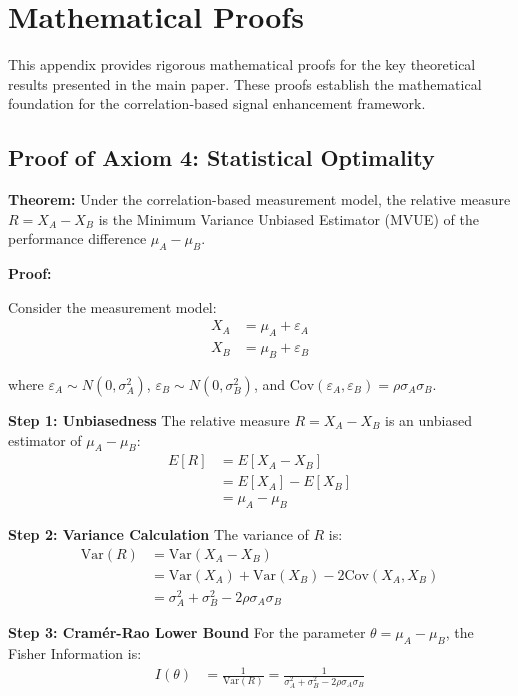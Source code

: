\appendix
\section{Mathematical Proofs}

This appendix provides rigorous mathematical proofs for the key theoretical results presented in the main paper. These proofs establish the mathematical foundation for the correlation-based signal enhancement framework.

\subsection{Proof of Axiom 4: Statistical Optimality}

\textbf{Theorem:} Under the correlation-based measurement model, the relative measure $R = X_A - X_B$ is the Minimum Variance Unbiased Estimator (MVUE) of the performance difference $\mu_A - \mu_B$.

\textbf{Proof:}

Consider the measurement model:
\begin{align}
X_A &= \mu_A + \varepsilon_A \\
X_B &= \mu_B + \varepsilon_B
\end{align}

where $\varepsilon_A \sim N(0, \sigma_A^2)$, $\varepsilon_B \sim N(0, \sigma_B^2)$, and $\text{Cov}(\varepsilon_A, \varepsilon_B) = \rho\sigma_A\sigma_B$.

\textbf{Step 1: Unbiasedness}
The relative measure $R = X_A - X_B$ is an unbiased estimator of $\mu_A - \mu_B$:
\begin{align}
E[R] &= E[X_A - X_B] \\
&= E[X_A] - E[X_B] \\
&= \mu_A - \mu_B
\end{align}

\textbf{Step 2: Variance Calculation}
The variance of $R$ is:
\begin{align}
\text{Var}(R) &= \text{Var}(X_A - X_B) \\
&= \text{Var}(X_A) + \text{Var}(X_B) - 2\text{Cov}(X_A, X_B) \\
&= \sigma_A^2 + \sigma_B^2 - 2\rho\sigma_A\sigma_B
\end{align}

\textbf{Step 3: Cramér-Rao Lower Bound}
For the parameter $\theta = \mu_A - \mu_B$, the Fisher Information is:
\begin{align}
I(\theta) &= \frac{1}{\text{Var}(R)} = \frac{1}{\sigma_A^2 + \sigma_B^2 - 2\rho\sigma_A\sigma_B}
\end{align}

